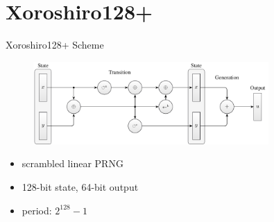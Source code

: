 \documentclass[aspectratio=169]{beamer}
\newcommand{\inputCodeBlock}[1]{%
    \begin{center}
        
    \end{center}
}
\begin{document}

  \section{Xoroshiro128+} %
  \label{sec:implementation}
    \begin{frame}{Xoroshiro128+ Scheme}
      \begin{figure}
        \includegraphics[width=0.8\textwidth]{figures/xrsr128p_scheme.pdf}
      \end{figure}
      \bigskip
      \begin{itemize}
        \pause
        \item scrambled linear PRNG
        \pause
        \item 128-bit state, 64-bit output
        \pause
        \item period: $2^{128}-1$
      \end{itemize}
    \end{frame}
\end{document}
